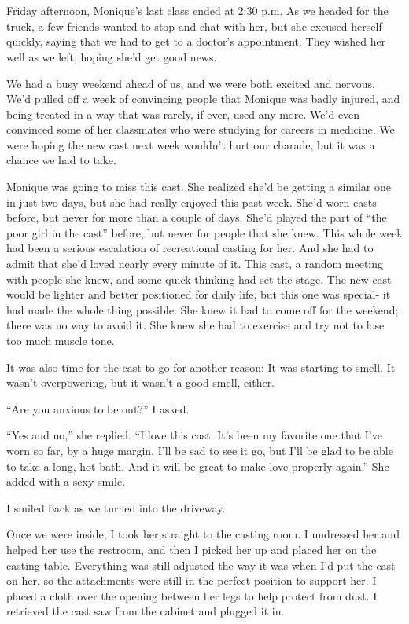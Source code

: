 \chapter{~}
Friday afternoon, Monique's last class ended at 2:30 p.m. As we headed for the truck, a few
friends wanted to stop and chat with her, but she excused herself quickly, saying that we had to
get to a doctor's appointment. They wished her well as we left, hoping she'd get good news.

We had a busy weekend ahead of us, and we were both excited and nervous. We'd pulled off a
week of convincing people that Monique was badly injured, and being treated in a way that was
rarely, if ever, used any more. We'd even convinced some of her classmates who were studying for
careers in medicine. We were hoping the new cast next week wouldn't hurt our charade, but it was
a chance we had to take.

\begin{thought}
Monique was going to miss this cast. She realized she'd be getting a similar one in just
two days, but she had really enjoyed this past week. She'd worn casts before, but never for more
than a couple of days. She'd played the part of ``the poor girl in the cast'' before, but never
for people that she knew. This whole week had been a serious escalation of recreational casting
for her. And she had to admit that she'd loved nearly every minute of it. This cast, a random
meeting with people she knew, and some quick thinking had set the stage. The new cast would be
lighter and better positioned for daily life, but this one was special- it had made the whole
thing possible. She knew it had to come off for the weekend; there was no way to avoid it. She
knew she had to exercise and try not to lose too much muscle tone.

It was also time for the cast to go for another reason: It was starting to smell. It wasn't
overpowering, but it wasn't a good smell, either.
\end{thought}

``Are you anxious to be out?'' I asked.

``Yes and no,'' she replied. ``I love this cast. It's been my favorite one that I've worn so
far, by a huge margin. I'll be sad to see it go, but I'll be glad to be able to take a long, hot
bath. And it will be great to make love properly again.'' She added with a sexy smile.

I smiled back as we turned into the driveway.

Once we were inside, I took her straight to the casting room. I undressed her and helped
her use the restroom, and then I picked her up and placed her on the casting table. Everything
was still adjusted the way it was when I'd put the cast on her, so the attachments were still in
the perfect position to support her. I placed a cloth over the opening between her legs to help
protect from dust. I retrieved the cast saw from the cabinet and plugged it in.

